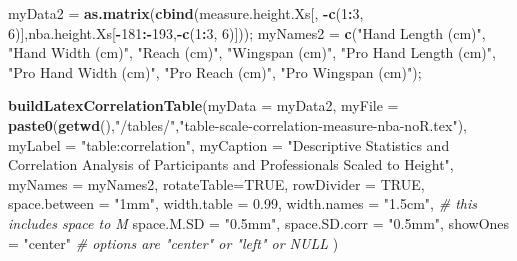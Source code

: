 \documentclass[]{article}
\newenvironment{Shaded}{\begin{snugshade}}{\end{snugshade}}
\newcommand{\CommentTok}[1]{\textcolor[rgb]{0.56,0.35,0.01}{\textit{#1}}}
\newcommand{\DataTypeTok}[1]{\textcolor[rgb]{0.13,0.29,0.53}{#1}}
\newcommand{\DecValTok}[1]{\textcolor[rgb]{0.00,0.00,0.81}{#1}}
\newcommand{\FloatTok}[1]{\textcolor[rgb]{0.00,0.00,0.81}{#1}}
\newcommand{\KeywordTok}[1]{\textcolor[rgb]{0.13,0.29,0.53}{\textbf{#1}}}
\newcommand{\NormalTok}[1]{#1}
\newcommand{\OperatorTok}[1]{\textcolor[rgb]{0.81,0.36,0.00}{\textbf{#1}}}
\newcommand{\OtherTok}[1]{\textcolor[rgb]{0.56,0.35,0.01}{#1}}
\newcommand{\StringTok}[1]{\textcolor[rgb]{0.31,0.60,0.02}{#1}}
\begin{document}
\begin{Shaded}
\begin{Highlighting}[]
\NormalTok{myData2 =}\StringTok{ }\KeywordTok{as.matrix}\NormalTok{(}\KeywordTok{cbind}\NormalTok{(measure.height.Xs[, }\OperatorTok{-}\KeywordTok{c}\NormalTok{(}\DecValTok{1}\OperatorTok{:}\DecValTok{3}\NormalTok{, }\DecValTok{6}\NormalTok{)],nba.height.Xs[}\OperatorTok{-}\DecValTok{181}\OperatorTok{:-}\DecValTok{193}\NormalTok{,}\OperatorTok{-}\KeywordTok{c}\NormalTok{(}\DecValTok{1}\OperatorTok{:}\DecValTok{3}\NormalTok{, }\DecValTok{6}\NormalTok{)]));}
\NormalTok{myNames2 =}\StringTok{ }\KeywordTok{c}\NormalTok{(}\StringTok{"Hand Length (cm)"}\NormalTok{, }\StringTok{"Hand Width (cm)"}\NormalTok{,  }\StringTok{"Reach (cm)"}\NormalTok{, }\StringTok{"Wingspan (cm)"}\NormalTok{,}
            \StringTok{"Pro Hand Length (cm)"}\NormalTok{, }\StringTok{"Pro Hand Width (cm)"}\NormalTok{, }\StringTok{"Pro Reach (cm)"}\NormalTok{, }\StringTok{"Pro Wingspan (cm)"}\NormalTok{);}

\KeywordTok{buildLatexCorrelationTable}\NormalTok{(}\DataTypeTok{myData =}\NormalTok{ myData2, }
                                \DataTypeTok{myFile =} \KeywordTok{paste0}\NormalTok{(}\KeywordTok{getwd}\NormalTok{(),}\StringTok{"/tables/"}\NormalTok{,}\StringTok{"table-scale-correlation-measure-nba-noR.tex"}\NormalTok{),}
                                \DataTypeTok{myLabel =} \StringTok{"table:correlation"}\NormalTok{,}
                                \DataTypeTok{myCaption =} \StringTok{"Descriptive Statistics and Correlation Analysis of Participants and Professionals Scaled to Height"}\NormalTok{,}
                                \DataTypeTok{myNames =}\NormalTok{ myNames2,}
                                \DataTypeTok{rotateTable=}\OtherTok{TRUE}\NormalTok{,}
                                \DataTypeTok{rowDivider =} \OtherTok{TRUE}\NormalTok{,}
                                \DataTypeTok{space.between =} \StringTok{"1mm"}\NormalTok{,}
                                \DataTypeTok{width.table =} \FloatTok{0.99}\NormalTok{,}
                                \DataTypeTok{width.names =} \StringTok{"1.5cm"}\NormalTok{, }\CommentTok{# this includes space to M}
                                \DataTypeTok{space.M.SD =} \StringTok{"0.5mm"}\NormalTok{,}
                                \DataTypeTok{space.SD.corr =} \StringTok{"0.5mm"}\NormalTok{,}
                                \DataTypeTok{showOnes =} \StringTok{"center"} \CommentTok{# options are "center" or "left" or NULL}
\NormalTok{                                )}
\end{Highlighting}
\end{Shaded}






\newpage
\theendnotes

\newpage
\begin{auxmulticols}{2}
\singlespacing 


\end{auxmulticols}

\newpage
{
\hypersetup{linkcolor=black}
\setcounter{tocdepth}{3}
\tableofcontents
}
\end{document}
